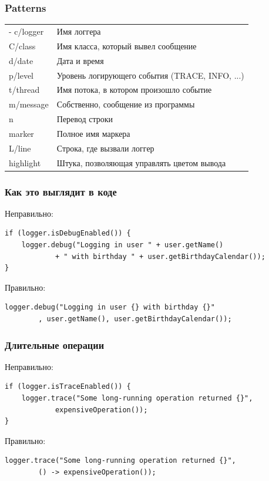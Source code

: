 \documentclass[xetex,mathserif,serif]{beamer}
\begin{document}
	\begin{frame}
		\frametitle{Patterns}
		\begin{tabu} {| X[0.2 l p] | X[1 l p] |}
			\tabucline-
			\everyrow{\tabucline-}
			c/logger   & Имя логгера                                    \\
			C/class    & Имя класса, который вывел сообщение            \\
			d/date     & Дата и время                                   \\
			p/level    & Уровень логирующего события (TRACE, INFO, ...) \\
			t/thread   & Имя потока, в котором произошло событие        \\
			m/message  & Собственно, сообщение из программы             \\
			n          & Перевод строки                                 \\
			marker     & Полное имя маркера                             \\
			L/line     & Строка, где вызвали логгер                     \\
			highlight  & Штука, позволяющая управлять цветом вывода     \\
		\end{tabu}
	\end{frame}

	\begin{frame}[fragile]
		\frametitle{Как это выглядит в коде}
		Неправильно:
		\begin{verbatim}
if (logger.isDebugEnabled()) {
    logger.debug("Logging in user " + user.getName() 
            + " with birthday " + user.getBirthdayCalendar());
}
		\end{verbatim}

		Правильно:
		\begin{verbatim}
logger.debug("Logging in user {} with birthday {}"
        , user.getName(), user.getBirthdayCalendar());
		\end{verbatim}
\end{frame}

	\begin{frame}[fragile]
		\frametitle{Длительные операции}
		Неправильно:
		\begin{verbatim}
if (logger.isTraceEnabled()) {
    logger.trace("Some long-running operation returned {}", 
            expensiveOperation());
}
		\end{verbatim}

		Правильно:
		\begin{verbatim}
logger.trace("Some long-running operation returned {}", 
        () -> expensiveOperation());
		\end{verbatim}
	\end{frame}
\end{document}
